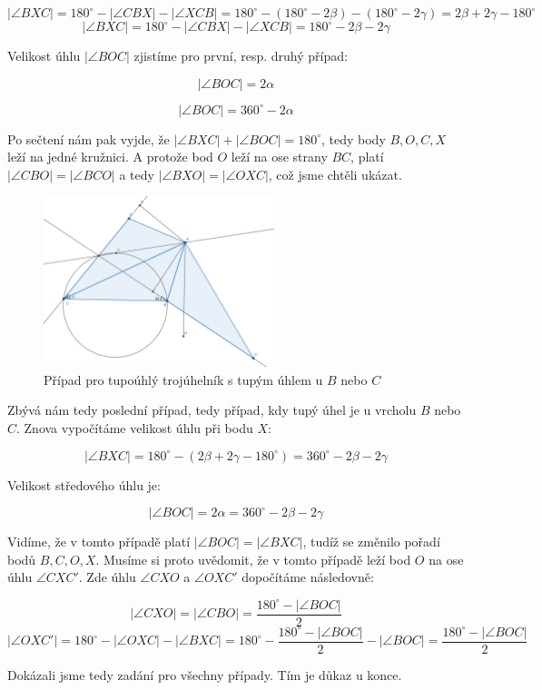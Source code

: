 \documentclass{fkssolpub}
\begin{document}
\[
	|\angle BXC| = 180^{\circ} - |\angle CBX| - |\angle XCB|
	= 180^{\circ} - (180^{\circ} - 2 \beta) - (180^{\circ} - 2 \gamma)
	= 2 \beta + 2 \gamma - 180^{\circ}
\]
\[
	|\angle BXC| = 180^{\circ} - |\angle CBX| - |\angle XCB|
	= 180^{\circ} - 2 \beta - 2 \gamma
\]

Velikost úhlu $|\angle BOC|$ zjistíme pro první, resp. druhý případ:

\[
	|\angle BOC| = 2 \alpha
\]

\[
	|\angle BOC| = 360^{\circ} - 2\alpha
\]

Po sečtení nám pak vyjde, že $|\angle BXC| + |\angle BOC| = 180^{\circ}$,
tedy body $B, O, C, X$ leží na jedné kružnici. A protože bod $O$ leží
na ose strany $BC$, platí $|\angle CBO| = |\angle BCO|$ a tedy
$|\angle BXO| = |\angle OXC|$, což jsme chtěli ukázat.

\begin{figure}[h!]
	\centering
	\includegraphics[width=0.6\textwidth]{4-fig3.png}
	\caption{Případ pro tupoúhlý trojúhelník s tupým úhlem u $B$ nebo $C$}
	\label{fig:3}
\end{figure}

Zbývá nám tedy poslední případ, tedy případ, kdy tupý úhel je u vrcholu $B$ nebo
$C$. Znova vypočítáme velikost úhlu při bodu $X$:

\[
	|\angle BXC| = 180^{\circ} - (2 \beta + 2 \gamma - 180^{\circ})
	= 360^{\circ} - 2 \beta - 2 \gamma
\]

Velikost středového úhlu je:

\[
	|\angle BOC| = 2 \alpha = 360^{\circ} - 2 \beta - 2 \gamma
\]

Vidíme, že v tomto případě platí $|\angle BOC| = |\angle BXC|$, tudíž se
změnilo pořadí bodů $B, C, O, X$. Musíme si proto uvědomit, že v tomto případě
leží bod $O$ na ose úhlu $\angle CXC'$. Zde úhlu $\angle CXO$ a $\angle OXC'$
dopočítáme následovně:

\[
	|\angle CXO| = |\angle CBO| = \frac{180^{\circ} - |\angle BOC|}{2}
\]
\[
	|\angle OXC'| = 180^{\circ} - |\angle OXC| - |\angle BXC| = 180^{\circ}
	- \frac{180^{\circ} - |\angle BOC|}{2} - |\angle BOC|
	= \frac{180^{\circ} - |\angle BOC|}{2}
\]

Dokázali jsme tedy zadání pro všechny případy. Tím je důkaz u konce.
\end{document}
